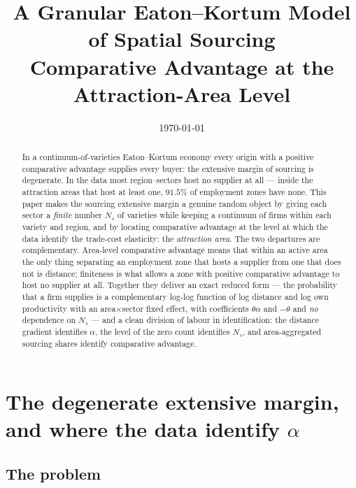 \documentclass[11pt]{article}
\title{\textbf{A Granular Eaton--Kortum Model of Spatial Sourcing\\[3pt]
\large Comparative Advantage at the Attraction-Area Level}}
\author{}
\date{\today}
\begin{document}
\maketitle

\begin{abstract}
In a continuum-of-varieties Eaton--Kortum economy every origin with a positive comparative
advantage supplies every buyer: the extensive margin of sourcing is degenerate. In the data most
region--sectors host no supplier at all --- inside the attraction areas that host at least one,
$91.5\%$ of employment zones have none. This paper makes the sourcing extensive margin a genuine
random object by giving each sector a \emph{finite} number $N_{s}$ of varieties while keeping a
continuum of firms within each variety and region, and by locating comparative advantage at the
level at which the data identify the trade-cost elasticity: the \emph{attraction area}. The two
departures are complementary. Area-level comparative advantage means that within an active area
the only thing separating an employment zone that hosts a supplier from one that does not is
distance; finiteness is what allows a zone with positive comparative advantage to host no supplier
at all. Together they deliver an exact reduced form --- the probability that a firm supplies is a
complementary log-log function of log distance and log own productivity with an
area$\times$sector fixed effect, with coefficients $\theta\alpha$ and $-\theta$ and \emph{no}
dependence on $N_{s}$ --- and a clean division of labour in identification: the distance gradient
identifies $\alpha$, the level of the zero count identifies $N_{s}$, and area-aggregated sourcing
shares identify comparative advantage.
\end{abstract}

\section{The degenerate extensive margin, and where the data identify $\alpha$}
\label{sec:motivation}

\subsection{The problem}
\end{document}
